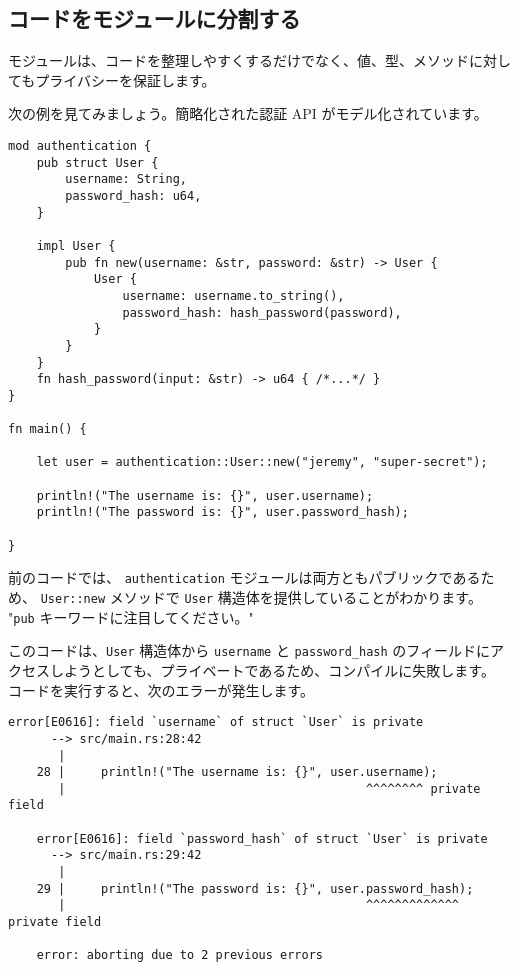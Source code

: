 \subsection{コードをモジュールに分割する}

モジュールは、コードを整理しやすくするだけでなく、値、型、メソッドに対してもプライバシーを保証します。

次の例を見てみましょう。簡略化された認証 API がモデル化されています。

\begin{lstlisting}[numbers=none]
mod authentication {
    pub struct User {
        username: String,
        password_hash: u64,
    }

    impl User {
        pub fn new(username: &str, password: &str) -> User {
            User {
                username: username.to_string(),
                password_hash: hash_password(password),
            }
        }    
    }
    fn hash_password(input: &str) -> u64 { /*...*/ }
}

fn main() {

    let user = authentication::User::new("jeremy", "super-secret");

    println!("The username is: {}", user.username);
    println!("The password is: {}", user.password_hash);

}
\end{lstlisting}

前のコードでは、 \texttt{authentication} モジュールは両方ともパブリックであるため、 \texttt{User::new} メソッドで \texttt{User} 構造体を提供していることがわかります。 "\texttt{pub} キーワードに注目してください。"

このコードは、\texttt{User} 構造体から \texttt{username} と \texttt{password\_hash} のフィールドにアクセスしようとしても、プライベートであるため、コンパイルに失敗します。 コードを実行すると、次のエラーが発生します。

\begin{lstlisting}[numbers=none]
    error[E0616]: field `username` of struct `User` is private
      --> src/main.rs:28:42
       |
    28 |     println!("The username is: {}", user.username);
       |                                          ^^^^^^^^ private field

    error[E0616]: field `password_hash` of struct `User` is private
      --> src/main.rs:29:42
       |
    29 |     println!("The password is: {}", user.password_hash);
       |                                          ^^^^^^^^^^^^^ private field

    error: aborting due to 2 previous errors
\end{lstlisting}

